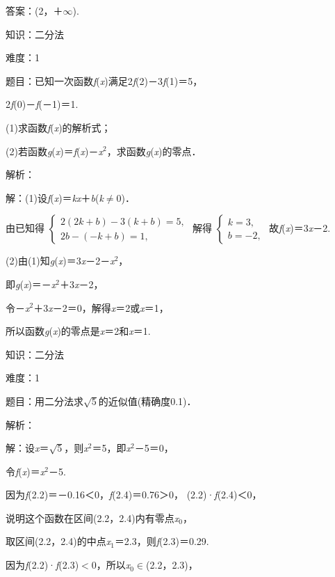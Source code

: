 \documentclass{article} %
\begin{document}
答案：(2，＋$\mathrm{\infty}$).

知识：二分法

难度：1

题目：已知一次函数\textit{f}(\textit{x})满足2\textit{f}(2)－3\textit{f}(1)＝5，

2\textit{f}(0)－\textit{f}(－1)＝1.

(1)求函数\textit{f}(\textit{x})的解析式；

(2)若函数\textit{g}(\textit{x})＝\textit{f}(\textit{x})－\textit{x}${}^{2}$，求函数\textit{g}(\textit{x})的零点．

解析：

解：(1)设\textit{f}(\textit{x})＝\textit{kx}＋\textit{b}(\textit{k}$\mathrm{\neq}$0)．

由已知得
$\left\{
\begin{array}{l}
2(2k+b)-3(k+b)=5,\\
2b-(-k+b)=1,
\end{array}
\right.$
解得
$\left\{
\begin{array}{l}
k=3,\\
b=-2,
\end{array}
\right.$
故\textit{f}(\textit{x})＝3\textit{x}－2.

(2)由(1)知\textit{g}(\textit{x})＝3\textit{x}－2－\textit{x}${}^{2}$，

即\textit{g}(\textit{x})＝－\textit{x}${}^{2}$＋3\textit{x}－2，

令－\textit{x}${}^{2}$＋3\textit{x}－2＝0，解得\textit{x}＝2或\textit{x}＝1，

所以函数\textit{g}(\textit{x})的零点是\textit{x}＝2和\textit{x}＝1.

知识：二分法

难度：1

题目：用二分法求$\sqrt{5}$的近似值(精确度0.1)．

解析：

解：设\textit{x}＝$\sqrt{5}$，则\textit{x}${}^{2}$＝5，即\textit{x}${}^{2}$－5＝0，

令\textit{f}(\textit{x})＝\textit{x}${}^{2}$－5.

因为\textit{f}(2.2)＝－0.16＜0，\textit{f}(2.4)＝0.76＞0，
(2.2)·\textit{f}(2.4)＜0，

说明这个函数在区间(2.2，2.4)内有零点\textit{x}${}_{0}$，

取区间(2.2，2.4)的中点\textit{x}${}_{1}$＝2.3，则\textit{f}(2.3)＝0.29.

因为\textit{f}(2.2)·\textit{f}(2.3)$\mathrm{<}$0，所以\textit{x}${}_{0}$$\mathrm{\in}$(2.2，2.3)，
\end{document}

